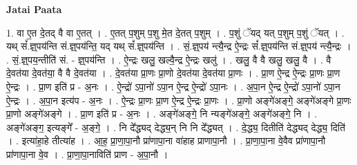 \documentclass[17pt]{extarticle}
\begin{document}
\textbf{Jatai Paata} \newline

1. वा ए॒त दे॒तद् वै वा ए॒तत् । . ए॒तत् प॒शुम् प॒शु मे॒त दे॒तत् प॒शुम् । . प॒शुं ॅयद् यत् प॒शुम् प॒शुं ॅयत् । . यथ् सं᳚.ज्ञ्॒पय॑न्ति सं.ज्ञ्॒पय॑न्ति॒ यद् यथ् सं᳚.ज्ञ्॒पय॑न्ति । . सं॒.ज्ञ्॒पय॑ न्त्यै॒न्द्र ऐ॒न्द्रः सं᳚.ज्ञ्॒पय॑न्ति सं.ज्ञ्॒पय॑ न्त्यै॒न्द्रः । . सं॒.ज्ञ्॒पय॒न्तीति॑ सं. - ज्ञ्॒पय॑न्ति । . ऐ॒न्द्रः खलु॒ खल्वै॒न्द्र ऐ॒न्द्रः खलु॑ । . खलु॒ वै वै खलु॒ खलु॒ वै । . वै दे॒वत॑या दे॒वत॑या॒ वै वै दे॒वत॑या । . दे॒वत॑या प्रा॒णः प्रा॒णो दे॒वत॑या दे॒वत॑या प्रा॒णः । . प्रा॒ण ऐ॒न्द्र ऐ॒न्द्रः प्रा॒णः प्रा॒ण ऐ॒न्द्रः । . प्रा॒ण इति॑ प्र - अ॒नः । . ऐ॒न्द्रो॑ ऽपा॒नो॑ ऽपा॒न ऐ॒न्द्र ऐ॒न्द्रो॑ ऽपा॒नः । . अ॒पा॒न ऐ॒न्द्र ऐ॒न्द्रो॑ ऽपा॒नो॑ ऽपा॒न ऐ॒न्द्रः । . अ॒पा॒न इत्य॑प - अ॒नः । . ऐ॒न्द्रः प्रा॒णः प्रा॒ण ऐ॒न्द्र ऐ॒न्द्रः प्रा॒णः । . प्रा॒णो अङ्गे॑अङ्गे॒ अङ्गे॑अङ्गे प्रा॒णः प्रा॒णो अङ्गे॑अङ्गे । . प्रा॒ण इति॑ प्र - अ॒नः । . अङ्गे॑अङ्गे॒ नि न्यङ्गे॑अङ्गे॒ अङ्गे॑अङ्गे॒ नि । . अङ्गे॑अङ्ग॒ इत्यङ्गे᳚ - अ॒ङ्गे॒ । . नि दे᳚द्ध्यद् देद्ध्य॒न् नि नि दे᳚द्ध्यत् । . दे॒द्ध्य॒ दितीति॑ देद्ध्यद् देद्ध्य॒ दिति॑ । . इत्या॑हा॒हे तीत्या॑ह । . आ॒ह॒ प्रा॒णा॒पा॒नौ प्रा॑णापा॒ना वा॑हाह प्राणापा॒नौ । . प्रा॒णा॒पा॒ना वे॒वैव प्रा॑णापा॒नौ प्रा॑णापा॒ना वे॒व । . प्रा॒णा॒पा॒नाविति॑ प्राण - अ॒पा॒नौ । \newline
\end{document}
